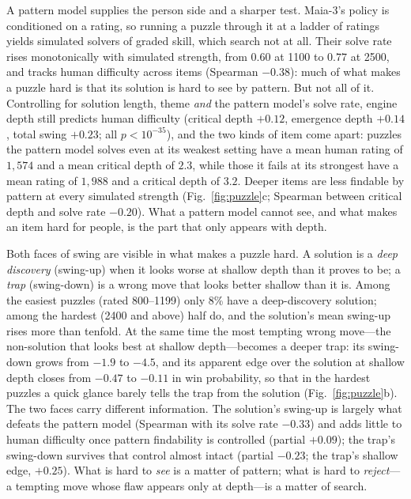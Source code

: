 A pattern model supplies the person side and a sharper test. Maia-3's policy is conditioned on
a rating, so running a puzzle through it at a ladder of ratings yields simulated solvers of
graded skill, which search not at all. Their solve rate rises monotonically with simulated
strength, from $0.60$ at 1100 to $0.77$ at 2500, and tracks human difficulty across items
(Spearman $-0.38$): much of what makes a puzzle hard is that its solution is hard to see by
pattern. But not all of it. Controlling for solution length, theme \emph{and} the pattern
model's solve rate, engine depth still predicts human difficulty (critical depth $+0.12$,
emergence depth $+0.14$, total swing $+0.23$; all $p<10^{-35}$), and the two kinds of item come
apart: puzzles the pattern model solves even at its weakest setting have a mean human rating of
$1{,}574$ and a mean critical depth of $2.3$, while those it fails at its strongest have a mean
rating of $1{,}988$ and a critical depth of $3.2$. Deeper items are less findable by pattern at
every simulated strength (Fig.~\ref{fig:puzzle}c; Spearman between critical depth and solve rate
$-0.20$). What a pattern model cannot see, and what makes an item hard for people, is the part
that only appears with depth.

Both faces of swing are visible in what makes a puzzle hard. A solution is a \emph{deep
discovery} (swing-up) when it looks worse at shallow depth than it proves to be; a
\emph{trap} (swing-down) is a wrong move that looks better shallow than it is. Among the
easiest puzzles (rated 800--1199) only 8\% have a deep-discovery solution; among the hardest
(2400 and above) half do, and the solution's mean swing-up rises more than tenfold. At the
same time the most tempting wrong move---the non-solution that looks best at shallow
depth---becomes a deeper trap: its swing-down grows from $-1.9$ to $-4.5$, and its apparent
edge over the solution at shallow depth closes from $-0.47$ to $-0.11$ in win probability, so
that in the hardest puzzles a quick glance barely tells the trap from the solution
(Fig.~\ref{fig:puzzle}b). The two faces carry different information. The solution's swing-up
is largely what defeats the pattern model (Spearman with its solve rate $-0.33$) and adds
little to human difficulty once pattern findability is controlled (partial $+0.09$); the
trap's swing-down survives that control almost intact (partial $-0.23$; the trap's shallow
edge, $+0.25$). What is hard to \emph{see} is a matter of pattern; what is hard to
\emph{reject}---a tempting move whose flaw appears only at depth---is a matter of search.

